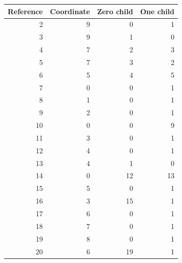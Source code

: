 \begin{tabular}{rrrr}
\toprule
Reference & Coordinate & Zero child & One child \\
\midrule
2 & 9 & 0 & 1 \\
3 & 9 & 1 & 0 \\
4 & 7 & 2 & 3 \\
5 & 7 & 3 & 2 \\
6 & 5 & 4 & 5 \\
7 & 0 & 0 & 1 \\
8 & 1 & 0 & 1 \\
9 & 2 & 0 & 1 \\
10 & 0 & 0 & 9 \\
11 & 3 & 0 & 1 \\
12 & 4 & 0 & 1 \\
13 & 4 & 1 & 0 \\
14 & 0 & 12 & 13 \\
15 & 5 & 0 & 1 \\
16 & 3 & 15 & 1 \\
17 & 6 & 0 & 1 \\
18 & 7 & 0 & 1 \\
19 & 8 & 0 & 1 \\
20 & 6 & 19 & 1 \\
\bottomrule
\end{tabular}
